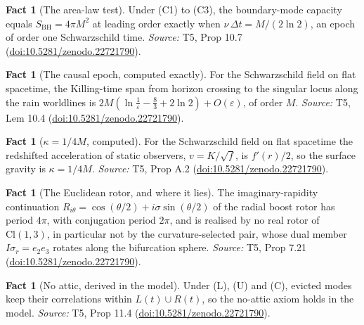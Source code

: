 \documentclass[11pt]{article}
\theoremstyle{definition}
\newtheorem{fact}[theorem]{Fact}
\theoremstyle{plain}
\newcommand{\changedmark}[2]{\marginpar{\raggedright\scriptsize\color{#1}#2}}
\providecommand{\Cl}{}\renewcommand{\Cl}{\mathrm{Cl}}
\providecommand{\SBH}{}\renewcommand{\SBH}{S_{\mathrm{BH}}}
\begin{document}
\begin{fact}[The area-law test]\label{c:singularity.area-law-test}
Under (C1) to (C3), the boundary-mode capacity equals $\SBH = 4\pi M^2$ at leading order exactly when $\nu\,\Delta t = M/(2\ln 2)$, an epoch of order one Schwarzschild time.
\emph{Source:} T5, Prop 10.7 (\href{https://doi.org/10.5281/zenodo.22721790}{doi:10.5281/zenodo.22721790}).
\end{fact}

\begin{fact}[The causal epoch, computed exactly]\label{c:singularity.causal-epoch-computed-exactly}
\changedmark{gray}{reworded}
For the Schwarzschild field on flat spacetime, the Killing-time span from horizon crossing to the singular locus along the rain worldlines is $2M(\ln\tfrac{1}{\varepsilon} - \tfrac83 + 2\ln 2) + O(\varepsilon)$, of order $M$.
\emph{Source:} T5, Lem 10.4 (\href{https://doi.org/10.5281/zenodo.22721790}{doi:10.5281/zenodo.22721790}).
\end{fact}

\begin{fact}[$\kappa = 1/4M$, computed]\label{c:singularity.computed}
For the Schwarzschild field on flat spacetime the redshifted acceleration of static observers, $v = K/\sqrt f$, is $f'(r)/2$, so the surface gravity is $\kappa = 1/4M$.
\emph{Source:} T5, Prop A.2 (\href{https://doi.org/10.5281/zenodo.22721790}{doi:10.5281/zenodo.22721790}).
\end{fact}

\begin{fact}[The Euclidean rotor, and where it lies]\label{c:singularity.euclidean-rotor-where-it-lies}
The imaginary-rapidity continuation $R_{i\theta} = \cos(\theta/2) + i\sigma\sin(\theta/2)$ of the radial boost rotor has period $4\pi$, with conjugation period $2\pi$, and is realised by no real rotor of $\Cl(1,3)$, in particular not by the curvature-selected pair, whose dual member $I\sigma_r = e_2e_3$ rotates along the bifurcation sphere.
\emph{Source:} T5, Prop 7.21 (\href{https://doi.org/10.5281/zenodo.22721790}{doi:10.5281/zenodo.22721790}).
\end{fact}

\begin{fact}[No attic, derived in the model]\label{c:singularity.no-attic-derived-model}
Under (L), (U) and (C), evicted modes keep their correlations within $L(t) \cup R(t)$, so the no-attic axiom holds in the model.
\emph{Source:} T5, Prop 11.4 (\href{https://doi.org/10.5281/zenodo.22721790}{doi:10.5281/zenodo.22721790}).
\end{fact}
\end{document}
